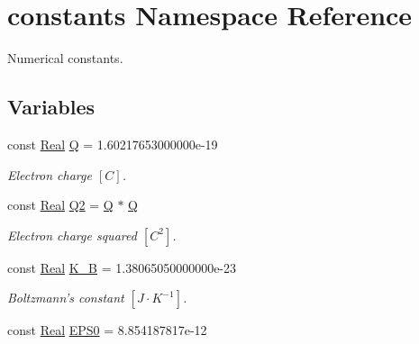 \hypertarget{namespaceconstants}{\section{constants Namespace Reference}
\label{namespaceconstants}
}


Numerical constants.  


\subsection*{Variables}
\begin{DoxyCompactItemize}
\item 
\hypertarget{namespaceconstants_a791181f54af6cd7794fe58fec8e4ce97}{const \hyperlink{typedefs_8h_a060b837c3b4486ee35317744156f3da2}{Real} \hyperlink{namespaceconstants_a791181f54af6cd7794fe58fec8e4ce97}{Q} = 1.\-60217653000000e-\/19}\label{namespaceconstants_a791181f54af6cd7794fe58fec8e4ce97}

\begin{DoxyCompactList}\small\item\em Electron charge $ \left[ C \right] $. \end{DoxyCompactList}\item 
\hypertarget{namespaceconstants_a6af60c0507d9627b476d85e3275b161e}{const \hyperlink{typedefs_8h_a060b837c3b4486ee35317744156f3da2}{Real} \hyperlink{namespaceconstants_a6af60c0507d9627b476d85e3275b161e}{Q2} = \hyperlink{namespaceconstants_a791181f54af6cd7794fe58fec8e4ce97}{Q} $\ast$ \hyperlink{namespaceconstants_a791181f54af6cd7794fe58fec8e4ce97}{Q}}\label{namespaceconstants_a6af60c0507d9627b476d85e3275b161e}

\begin{DoxyCompactList}\small\item\em Electron charge squared $ \left[ C^2 \right] $. \end{DoxyCompactList}\item 
\hypertarget{namespaceconstants_a02b04d1da9b8254ea609a8334de09da7}{const \hyperlink{typedefs_8h_a060b837c3b4486ee35317744156f3da2}{Real} \hyperlink{namespaceconstants_a02b04d1da9b8254ea609a8334de09da7}{K\-\_\-\-B} = 1.\-38065050000000e-\/23}\label{namespaceconstants_a02b04d1da9b8254ea609a8334de09da7}

\begin{DoxyCompactList}\small\item\em Boltzmann's constant $ \left[ J \cdot K^{-1} \right] $. \end{DoxyCompactList}\item 
\hypertarget{namespaceconstants_a1be297a9c9ca81f310b848dbe6c5525d}{const \hyperlink{typedefs_8h_a060b837c3b4486ee35317744156f3da2}{Real} \hyperlink{namespaceconstants_a1be297a9c9ca81f310b848dbe6c5525d}{E\-P\-S0} = 8.\-854187817e-\/12}\label{namespaceconstants_a1be297a9c9ca81f310b848dbe6c5525d}


\end{DoxyCompactItemize}
